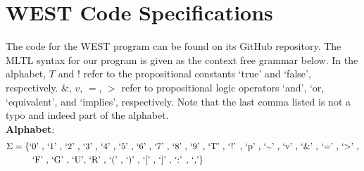 \documentclass[runningheads]{llncs}
\begin{document}
 \vspace{-0.1in}
 \section{WEST Code Specifications} \label{specs}
  \vspace{-0.1in}
The code for the WEST program can be found on its %
{GitHub} repository. The MLTL syntax for our program is given as the context free grammar below. In the alphabet, $T$ and $!$ refer to the propositional constants `true' and `false', respectively. $\&$, $v$, $=$, $>$ refer to propositional logic operators `and', `or, `equivalent', and `implies', respectively. Note that the last comma listed is not a typo and indeed part of the alphabet. \\
\textbf{Alphabet}: 
\begin{align*}
    \Sigma = \{&\text{`0' , `1' , `2' , `3' , `4' , `5' , `6' , `7' , `8' , `9' , `T' , `!' , `p' , `$\scriptstyle{\sim}$' , `v' , `\&' , `=' , `\mbox{$>$}' ,}\\
    &\text{ `F' , `G' , `U', `R' , `(' , `)' , `[' , `]' , `:' , `,'}\}
\end{align*}
\end{document}
